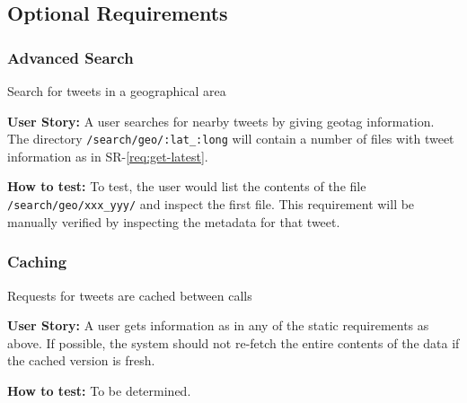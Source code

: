 \subsection{Optional Requirements}

\setcounter{requirements}{1}
\renewenvironment{Requirements}
  {\begin{list}{OR-\arabic{requirements}.}%
               {}}%
  {\end{list}}

\begin{Requirements}

\subsubsection{Advanced Search}

\item Search for tweets in a geographical area

\textbf{User Story:} A user searches for nearby tweets by giving geotag
information. The directory \texttt{/search/geo/:lat\_:long} will contain a
number of files with tweet information as in SR-\ref{req:get-latest}.

\textbf{How to test:} To test, the user would list the contents of the file
\texttt{/search/geo/xxx\_yyy/} and inspect the first file. This requirement will
be manually verified by inspecting the metadata for that tweet.

\subsubsection{Caching}

\item Requests for tweets are cached between calls

\textbf{User Story:} A user gets information as in any of the static
requirements as above. If possible, the system should not re-fetch the entire
contents of the data if the cached version is fresh.

\textbf{How to test:} To be determined.

\end{Requirements}
